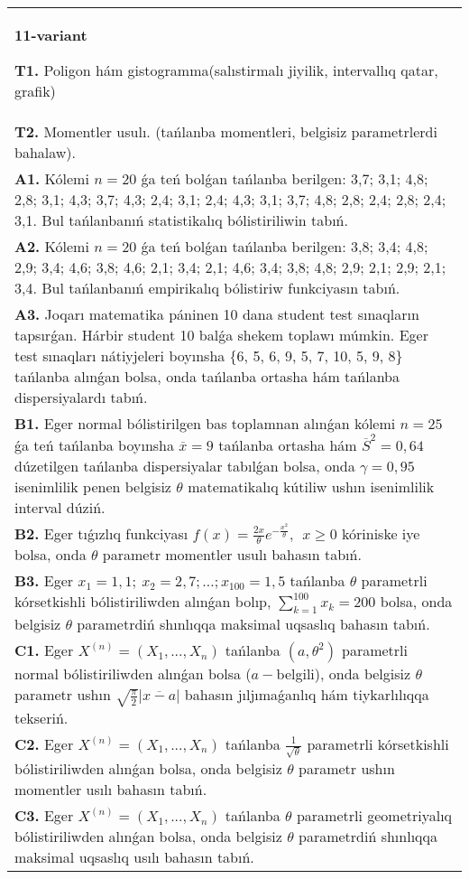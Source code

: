 \documentclass{article}
\begin{document}
\begin{tabular}{m{17cm}}
\textbf{11-variant}
\newline

\textbf{T1.} 
Poligon hám gistogramma(salıstirmalı jiyilik, intervallıq qatar, grafik)
 \\
\textbf{T2.} 
Momentler usulı. (tańlanba momentleri, belgisiz parametrlerdi bahalaw).
 \\
\textbf{A1.} 
Kólemi \(n = 20\) ǵa teń bolǵan tańlanba berilgen: 3,7; 3,1; 4,8; 2,8; 3,1; 4,3; 3,7; 4,3; 2,4; 3,1; 2,4; 4,3; 3,1; 3,7; 4,8; 2,8; 2,4; 2,8; 2,4; 3,1. Bul tańlanbanıń statistikalıq bólistiriliwin tabıń.
 \\
\textbf{A2.} 
Kólemi \(n = 20\) ǵa teń bolǵan tańlanba berilgen: 3,8; 3,4; 4,8; 2,9; 3,4; 4,6; 3,8; 4,6; 2,1; 3,4; 2,1; 4,6; 3,4; 3,8; 4,8; 2,9; 2,1; 2,9; 2,1; 3,4. Bul tańlanbanıń empirikalıq bólistiriw funkciyasın tabıń.
 \\
\textbf{A3.} 
Joqarı matematika páninen 10 dana student test sınaqların tapsırǵan. Hárbir student 10 balǵa shekem toplawı múmkin. Eger test sınaqları nátiyjeleri boyınsha \{6, 5, 6, 9, 5, 7, 10, 5, 9, 8\} tańlanba alınǵan bolsa, onda tańlanba ortasha hám tańlanba dispersiyalardı tabıń.
 \\
\textbf{B1.} 
Eger normal bólistirilgen bas toplamnan alınǵan kólemi \(n = 25\) ǵa teń tańlanba boyınsha \(\overline{x} = 9\) tańlanba ortasha hám \({\overline{S}}^{2} = 0,64\) dúzetilgen tańlanba dispersiyalar tabılǵan bolsa, onda \(\gamma = 0,95\) isenimlilik penen belgisiz \(\theta\) matematikalıq kútiliw ushın isenimlilik interval dúziń.
 \\
\textbf{B2.} 
Eger tıǵızlıq funkciyası \(f(x) = \frac{2x}{\theta}e^{- \frac{x^{2}}{\theta}},\ \ x \geq 0\) kóriniske iye bolsa, onda \(\theta\) parametr momentler usulı bahasın tabıń.
 \\
\textbf{B3.} 
Eger \(x_{1} = 1,1;\ x_{2} = 2,7;\ldots;x_{100} = 1,5\) tańlanba \(\theta\) parametrli kórsetkishli bólistiriliwden alınǵan bolıp, \(\sum_{k = 1}^{100}x_{k} = 200\) bolsa, onda belgisiz \(\theta\) parametrdiń shınlıqqa maksimal uqsaslıq bahasın tabıń.
 \\
\textbf{C1.} 
Eger \(X^{(n)} = \left( X_{1},...,X_{n} \right)\) tańlanba \(\left( a,\theta^{2} \right)\) parametrli normal bólistiriliwden alınǵan bolsa (\(a -\)belgili), onda belgisiz \(\theta\) parametr ushın \(\sqrt{\frac{\pi}{2}}\left| \overline{x - a} \right|\) bahasın jıljımaǵanlıq hám tiykarlılıqqa tekseriń.
 \\
\textbf{C2.} 
Eger \(X^{(n)} = \left( X_{1},...,X_{n} \right)\) tańlanba \(\frac{1}{\sqrt{\theta}}\) parametrli kórsetkishli bólistiriliwden alınǵan bolsa, onda belgisiz \(\theta\) parametr ushın momentler usılı bahasın tabıń.
 \\
\textbf{C3.} 
Eger \(X^{(n)} = \left( X_{1},...,X_{n} \right)\) tańlanba \(\theta\) parametrli geometriyalıq bólistiriliwden alınǵan bolsa, onda belgisiz \(\theta\) parametrdiń shınlıqqa maksimal uqsaslıq usılı bahasın tabıń.
 \\

\end{tabular}
\vspace{1cm}
\end{document}
